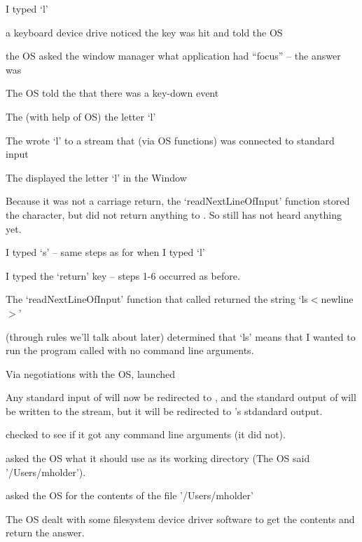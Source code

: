 \documentclass[landscape]{foils}
\begin{document}
\begin{compactitem}
	\item I typed `l'
	\begin{compactenum}	
		\item a keyboard device drive noticed the key was hit and told the OS
		\item the OS asked the window manager what application had ``focus'' -- the answer was 
		\item The OS told the  that there was a key-down event
		\item {\color{green}The  (with help of OS)  the letter `l'}
		\item {\color{green}The  wrote `l' to a stream that (via OS functions) was connected to  standard input}
		\item {\color{green}The  displayed the letter `l' in the Window}
		\item {\color{red}Because it was not a carriage return, the `readNextLineOfInput' function stored the character, but did not return anything to . So  still has not heard anything yet.}
	\end{compactenum}
	\item I typed `s' -- same steps as for when I typed `l'
	\item I typed the `return' key -- steps 1-6 occurred as before.
	\item {\color{red}The `readNextLineOfInput' function that  called returned the string `ls$<$newline$>$'}
	\item {\color{red} (through rules we'll talk about later) determined that `ls' means that I wanted to run the program called  with no command line arguments.}
	\item Via negotiations with the OS, {\color{red} launched }
	\item Any standard input of  will now be redirected to , and the standard output of  will be written to the stream, but it will be redirected to 's stdandard output.
	\item {} checked to see if it got any command line arguments (it did not).
	\item {} asked the OS what it should use as its working directory (The OS said '/Users/mholder').
	\item {} asked the OS for the contents of the file '/Users/mholder'
	\item The OS dealt with some filesystem device driver software to get the contents and return the answer.

\end{compactitem}
\end{document}
